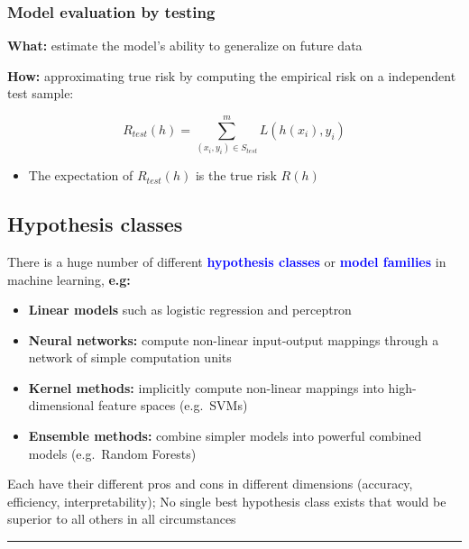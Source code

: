 \documentclass[12pt, a4paper]{article}
\begin{document}
\subsubsection{Model evaluation by testing
}\label{model-evaluation-by-testing}

\textbf{What:} estimate the model's ability to generalize on future data

\textbf{How:} approximating true risk by computing the
empirical risk on a independent test sample:

\[R_{test}(h) = \sum_{(x_i,y_i) \in S_{test}}^{m} L(h(x_i),y_i)\]

\begin{itemize}
  \item The expectation of $R_{test}(h)$ is the true risk $R(h)$
\end{itemize}




\subsection{Hypothesis classes }\label{hypothesis-classes}

There is a huge number of different \textbf{\textcolor{blue}{hypothesis classes}} or
\textbf{\textcolor{blue}{model families}} in machine learning, \textbf{e.g:}

\begin{itemize}
  \item
    \textbf{Linear models} such as logistic regression and perceptron
  \item
    \textbf{Neural networks:} compute non-linear input-output mappings
    through a network of simple computation units
  \item
    \textbf{Kernel methods:} implicitly compute non-linear mappings into
    high-dimensional feature spaces (e.g.~SVMs)
  \item
    \textbf{Ensemble methods:} combine simpler models into powerful
    combined models (e.g.~Random Forests)
\end{itemize}

Each have their different pros and cons in different dimensions
(accuracy, efficiency, interpretability); No single best hypothesis
class exists that would be superior to all others in all circumstances

\begin{center}\rule{3in}{0.4pt}\end{center}
\end{document}

